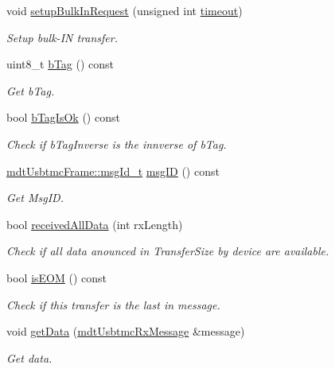 \begin{DoxyCompactItemize}
void \hyperlink{classmdt_usbtmc_bulk_transfer_aa46a28a062659f75808313a0f3b4d109}{setup\-Bulk\-In\-Request} (unsigned int \hyperlink{classmdt_usb_transfer_a3262511f6062348132e7ee689c24226c}{timeout})
\begin{DoxyCompactList}\small\item\em Setup bulk-\/\-I\-N transfer. \end{DoxyCompactList}\item 
uint8\-\_\-t \hyperlink{classmdt_usbtmc_bulk_transfer_a7975795ea5299a1a82c1ec303be24e2e}{b\-Tag} () const 
\begin{DoxyCompactList}\small\item\em Get b\-Tag. \end{DoxyCompactList}\item 
bool \hyperlink{classmdt_usbtmc_bulk_transfer_a57a8fd2f99866998e4b76d0318c0cfb4}{b\-Tag\-Is\-Ok} () const 
\begin{DoxyCompactList}\small\item\em Check if b\-Tag\-Inverse is the innverse of b\-Tag. \end{DoxyCompactList}\item 
\hyperlink{classmdt_usbtmc_frame_abf1e449c264011341c477d45eb700c42}{mdt\-Usbtmc\-Frame\-::msg\-Id\-\_\-t} \hyperlink{classmdt_usbtmc_bulk_transfer_a1ee96cb0af0b5e1322ceb6ed65082345}{msg\-I\-D} () const 
\begin{DoxyCompactList}\small\item\em Get Msg\-I\-D. \end{DoxyCompactList}\item 
bool \hyperlink{classmdt_usbtmc_bulk_transfer_ab1507e543f8922866df22c9041baf16d}{received\-All\-Data} (int rx\-Length)
\begin{DoxyCompactList}\small\item\em Check if all data anounced in Transfer\-Size by device are available. \end{DoxyCompactList}\item 
bool \hyperlink{classmdt_usbtmc_bulk_transfer_ae30384384de8bb085c9e55cf637795e2}{is\-E\-O\-M} () const 
\begin{DoxyCompactList}\small\item\em Check if this transfer is the last in message. \end{DoxyCompactList}\item 
void \hyperlink{classmdt_usbtmc_bulk_transfer_abbab24a2899ef22e28d503708699bc4e}{get\-Data} (\hyperlink{classmdt_usbtmc_rx_message}{mdt\-Usbtmc\-Rx\-Message} \&message)
\begin{DoxyCompactList}\small\item\em Get data. \end{DoxyCompactList}\item 

\end{DoxyCompactItemize}
